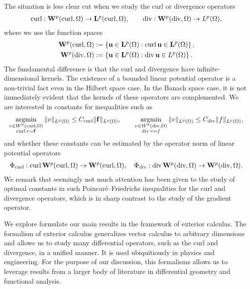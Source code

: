 \documentclass[a4paper]{amsart}
\begin{document}
The situation is less clear cut when we study the curl or divergence operators
\begin{align*}
    \operatorname{curl} : {\mathbf W}^{p}(\operatorname{curl},\Omega) \rightarrow {\mathbf L}^{p}(\operatorname{curl},\Omega),
    \qquad 
    \operatorname{div} : {\mathbf W}^{p}(\operatorname{div},\Omega) \rightarrow L^{p}(\Omega),
\end{align*}
where we use the function spaces
\begin{align*}
    {\mathbf W}^{p}(\operatorname{curl},\Omega) &:= \left\{ {\mathbf u} \in {\mathbf L}^p(\Omega) : \operatorname{curl} {\mathbf u} \in {\mathbf L}^p(\Omega) \right\}
    ,
    \\
    {\mathbf W}^{p}(\operatorname{div},\Omega) &:= \left\{ {\mathbf u} \in {\mathbf L}^p(\Omega) : \operatorname{div} {\mathbf u} \in L^p(\Omega) \right\}
    .
\end{align*}
The fundamental difference is that the curl and divergence have infinite-dimensional kernels. 
{\color{red}The existence of a bounded linear potential operator is a non-trivial fact even in the Hilbert space case. }
In the Banach space case, it is not immediately evident that the kernels of these operators are complemented.
We are interested in constants for inequalities such as 
\begin{align*}
    \operatorname*{{\rm argmin}}\limits_{ \substack{ v \in W^{p}(\operatorname{curl},\Omega) \\ \operatorname{curl} v = {\mathbf f} } } \| v \|_{L^{p}(\Omega)}
    \leq 
    C_{\operatorname{curl}}
    \| {\mathbf f} \|_{L^{p}(\Omega)}
    ,
    \qquad 
    \operatorname*{{\rm argmin}}\limits_{ \substack{ v \in W^{p}(\operatorname{div},\Omega) \\ \operatorname{div} v = f } } \| v \|_{L^{p}(\Omega)}
    \leq 
    C_{\operatorname{div}}
    \| f \|_{L^{p}(\Omega)}
    ,
\end{align*}
and whether these constants can be estimated by the operator norm of linear potential operators 
\begin{align*}
    \Phi_{\operatorname{curl}} : \operatorname{curl} {\mathbf W}^{p}(\operatorname{curl},\Omega) \rightarrow {\mathbf W}^{p}(\operatorname{curl},\Omega)
    ,
    \quad 
    \Phi_{\operatorname{div}} : \operatorname{div} {\mathbf W}^{p}(\operatorname{div},\Omega) \rightarrow {\mathbf W}^{p}(\operatorname{div},\Omega)
    .
\end{align*}
We remark that seemingly not much attention has been given to the study of optimal constants in such Poincar\'e--Friedrichs inequalities for the curl and divergence operators, 
which is in sharp contrast to the study of the gradient operator. 

We explore formulate our main results in the framework of exterior calculus.
The formalism of exterior calculus generalizes vector calculus to arbitrary dimensions and allows us to study many differential operators, such as the curl and divergence, in a unified manner. 
%
It is used ubiquitiously in physics and engineering. 
%
For the purpose of our discussion, this formalisms allows us to leverage results from a larger body of literature in differential geometry and functional analysis. 
\\
\end{document}
